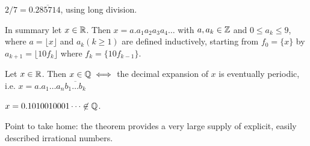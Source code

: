 \documentclass[twoside]{scrartcl}
\begin{document}
\begin{example}
$2/7 = 0.\overline{285714}$, using long division. 
\end{example}\vspace*{5pt}

%
%

In summary let $x \in\mathbb{R}$. Then $x = a.a_1a_2a_3a_4\dots$ with $a,a_k \in \mathbb{Z}$ and $0\leq a_k \leq 9$, where $a = \lfloor x \rfloor$ and $a_k (k \geq 1)$ are defined inductively, starting from $f_0 = \{x\}$ by $a_{k+1} = \lfloor 10f_k\rfloor$ where $f_k = \{10f_{k-1}\}$.\\

\begin{theorem}
Let $x \in\mathbb{R}$. Then $x \in\mathbb{Q} \iff$	the decimal expansion of $x$ is eventually periodic, i.e. $x = a. a_1\dots a_n \overline{b_1\dots b_k}$
\end{theorem}\vspace*{5pt}

\begin{example}
	$x = 0.1010010001\dots \not \in \mathbb{Q}$. 
\end{example}

Point to take home: the theorem provides a very large supply of explicit, easily described irrational numbers. 
\end{document}
